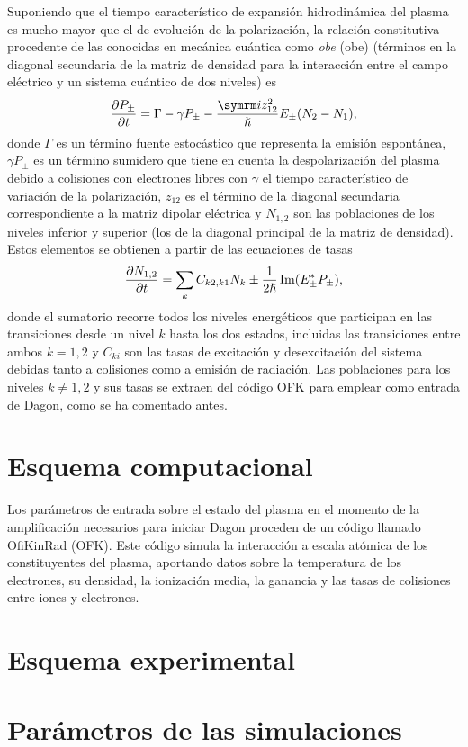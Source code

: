 Suponiendo que el tiempo característico de expansión hidrodinámica del plasma es mucho mayor que el de evolución de la polarización, la relación constitutiva procedente de las conocidas en mecánica cuántica como \emph{\acrlong{obe}} (\acrshort{obe}) (términos en la diagonal secundaria de la matriz de densidad para la interacción entre el campo eléctrico y un sistema cuántico de dos niveles) es
\begin{equation}
    \frac{\partial P_{\pm}}{\partial t} 
    =
    \Gamma - \gamma P_{\pm} - \frac{\iu z_{12}^2}{\hslash}E_{\pm}(N_2-N_1),
\end{equation}
donde $\Gamma$ es un término fuente estocástico que representa la emisión espontánea, $\gamma P_{\pm}$ es un término sumidero que tiene en cuenta la despolarización del plasma debido a colisiones con electrones libres con $\gamma$ el tiempo característico de variación de la polarización, $z_{12}$ es el término de la diagonal secundaria correspondiente a la matriz dipolar eléctrica y $N_{1,2}$ son las poblaciones de los niveles inferior y superior (los de la diagonal principal de la matriz de densidad). Estos elementos se obtienen a partir de las ecuaciones de tasas
\begin{equation}
    \frac{\partial N_{1,2}}{\partial t}
    =
    \sum_k C_{k2,k1}N_{k} \pm \frac{1}{2\hslash}\operatorname{\operatorname{Im}}(E_{\pm}^*P_{\pm}),
\end{equation}
\noindent
donde el sumatorio recorre todos los niveles energéticos que participan en las transiciones desde un nivel $k$ hasta los dos estados, incluidas las transiciones entre ambos $k=1, 2$ y $C_{ki}$ son las tasas de excitación y desexcitación del sistema debidas tanto a colisiones como a emisión de radiación. Las poblaciones para los niveles $k\neq 1, 2$ y sus tasas se extraen del código OFK para emplear como entrada de Dagon, como se ha comentado antes.

\section{Esquema computacional} \label{sec32}
Los parámetros de entrada sobre el estado del plasma en el momento de la amplificación necesarios para iniciar Dagon proceden de un código llamado OfiKinRad (OFK). Este código simula la interacción a escala atómica de los constituyentes del plasma, aportando datos sobre la temperatura de los electrones, su densidad, la ionización media, la ganancia y las tasas de colisiones entre iones y electrones.

\section{Esquema experimental} \label{sec33}

\section{Parámetros de las simulaciones} \label{sec34}

